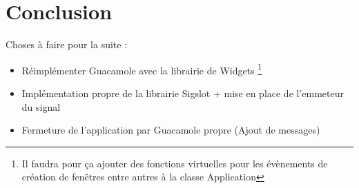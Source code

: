 \section{Conclusion}

Choses à faire pour la suite :

  
\begin{itemize}
  \item Réimplémenter Guacamole avec la librairie de Widgets
      \footnote{Il faudra pour ça ajouter des fonctions virtuelles pour les évènements de création de fenêtres entre autres à la classe Application}
  \item Implémentation propre de la librairie Sigslot + mise en place de l'emmeteur du signal
  \item Fermeture de l'application par Guacamole propre (Ajout de messages)
\end{itemize}